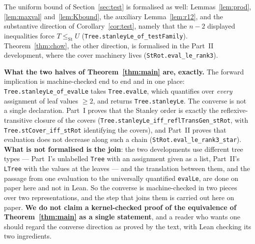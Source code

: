 \documentclass[11pt,a4paper]{article}
\theoremstyle{plain}
\theoremstyle{definition}
\newcommand{\St}{\mathrm{St}}
\begin{document}
The uniform bound of Section~\ref{sec:test} is formalised as well:
Lemmas~\ref{lem:prod}, \ref{lem:maxval} and~\ref{lem:Kbound}, the auxiliary
Lemma~\ref{lem:r12}, and the substantive direction of Corollary~\ref{cor:test}, namely
that the $n-2$ displayed inequalities force $T\le_{\St}U$
(\verb|Tree.stanleyLe_of_testFamily|). Theorem~\ref{thm:chow}, the other direction, is
formalised in the Part~II development, where the cover machinery lives
(\verb|StRot.eval_le_rank3|).

\begin{sloppypar}
\textbf{What the two halves of Theorem~\ref{thm:main} are, exactly.}  The forward
implication is machine-checked end to end and in one place:
\verb|Tree.stanleyLe_of_evalLe| takes \verb|Tree.evalLe|, which quantifies over
\emph{every} assignment of leaf values $\ge2$, and returns \verb|Tree.stanleyLe|.  The
converse is not a single declaration.  Part~I proves that the Stanley order is exactly
the reflexive-transitive closure of the covers
(\verb|Tree.stanleyLe_iff_reflTransGen_stRot|, with
\verb|Tree.stCover_iff_stRot| identifying the covers), and Part~II proves that
evaluation does not decrease along such a chain
(\verb|StRot.eval_le_rank3_star|).  \textbf{What is not formalised is the join}: the two
developments use different tree types --- Part~I's unlabelled \verb|Tree| with an
assignment given as a list, Part~II's \verb|LTree| with the values at the leaves --- and
the translation between them, and the passage from one evaluation to the universally
quantified \verb|evalLe|, are done on paper here and not in Lean.  So the converse is
machine-checked in two pieces over two representations, and the step that joins them is
carried out here on paper. \textbf{We do not claim a kernel-checked proof of the
equivalence of Theorem~\ref{thm:main} as a single statement}, and a reader who wants one
should regard the converse direction as proved by the text, with Lean checking its two
ingredients.
\end{sloppypar}
\end{document}
